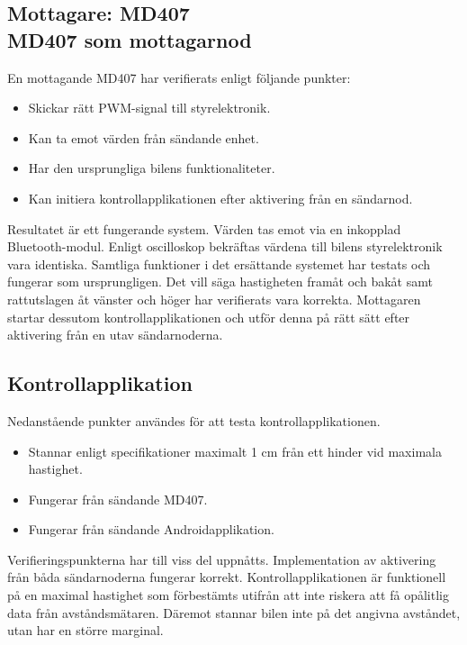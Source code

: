 \documentclass[a4paper]{article}
\begin{document}
\subsection{Mottagare: MD407 \\ MD407 som mottagarnod}
En mottagande MD407 har verifierats enligt följande punkter:

\begin{itemize}
\item Skickar rätt PWM-signal till styrelektronik.
\item Kan ta emot värden från sändande enhet.
\item Har den ursprungliga bilens funktionaliteter.
\item Kan initiera kontrollapplikationen efter aktivering från en sändarnod.
\end{itemize}

\noindent
Resultatet är ett fungerande system. Värden tas emot via en inkopplad Bluetooth-modul. Enligt oscilloskop bekräftas värdena till bilens styrelektronik vara identiska. Samtliga funktioner i det ersättande systemet har testats och fungerar som ursprungligen. Det vill säga hastigheten framåt och bakåt samt rattutslagen åt vänster och höger har verifierats vara korrekta. Mottagaren startar dessutom kontrollapplikationen och utför denna på rätt sätt efter aktivering från en utav sändarnoderna.




\subsection{Kontrollapplikation}
Nedanstående punkter användes för att testa kontrollapplikationen.

\begin{itemize}
\item Stannar enligt specifikationer maximalt 1 cm från ett hinder vid maximala hastighet.
\item Fungerar från sändande MD407.
\item Fungerar från sändande Androidapplikation.
\end{itemize}


\noindent
Verifieringspunkterna har till viss del uppnåtts. Implementation av aktivering från båda sändarnoderna fungerar korrekt. Kontrollapplikationen är funktionell på en maximal hastighet som förbestämts utifrån att inte riskera att få opålitlig data från avståndsmätaren. Däremot stannar bilen inte på det angivna avståndet, utan har en större marginal.
\end{document}
